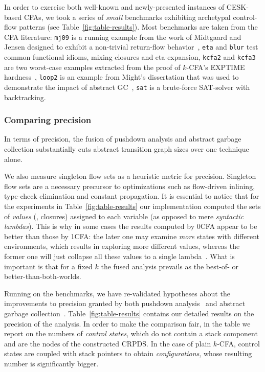 In order to exercise both well-known and newly-presented instances of
CESK-based CFAs, we took a series of \emph{small} benchmarks
exhibiting archetypal control-flow patterns (see
Table~\ref{fig:table-results}).
Most benchmarks are taken from the CFA literature: \texttt{mj09} is a
running example from the work of Midtgaard and Jensen designed to
exhibit a non-trivial return-flow
behavior~\cite{mattmight:Midtgaard:2007:Dissertation}, \texttt{eta}
and \texttt{blur} test common functional idioms, mixing closures and
eta-expansion, \texttt{kcfa2} and \texttt{kcfa3} are two worst-case
examples extracted from the proof of $k$-CFA's EXPTIME
hardness~\cite{dvanhorn:VanHorn-Mairson:ICFP08}, \texttt{loop2} is
an example from Might's dissertation that was used to demonstrate
the impact of abstract GC~\cite[Section
13.3]{mattmight:Might:2007:Dissertation}, \texttt{sat} is a
brute-force SAT-solver with backtracking.

\subsubsection{Comparing precision}
\label{sec:comparing-precision}

In terms of precision, the fusion of pushdown analysis and abstract
garbage collection substantially cuts abstract transition graph sizes
over one technique alone.

We also measure singleton flow sets as a heuristic metric for precision.
Singleton flow sets are a necessary precursor to optimizations such as
flow-driven inlining, type-check elimination and constant propagation.
It is essential to notice that for the experiments in
Table~\ref{fig:table-results} our implementation computed the sets of
\emph{values} (\ie, closures) assigned to each variable (as opposed to
mere \emph{syntactic lambdas}). This is why in some cases the results
computed by 0CFA appear to be better than those by 1CFA: the later one
may examine \emph{more} states with different environments, which
results in exploring more different values, whereas the former one
will just collapse all these values to a single
lambda~\cite{mattmight:Might:2010:mCFA}.
What is important is that for a fixed $k$ the fused analysis prevails
as the best-of- or better-than-both-worlds.

Running on the benchmarks, we have re-validated hypotheses about
the improvements to precision granted by both pushdown
analysis~\cite{mattmight:Vardoulakis:2010:CFA2} and abstract
garbage collection~\cite{mattmight:Might:2007:Dissertation}.
Table~\ref{fig:table-results} contains our detailed
results on the precision of the analysis. In order to make the
comparison fair, in the table we report on the numbers of
\emph{control states}, which do not contain a stack component and are
the nodes of the constructed CRPDS. In the case of plain $k$-CFA,
control states are coupled with stack pointers to obtain
\emph{configurations}, whose resulting number is significantly bigger.

